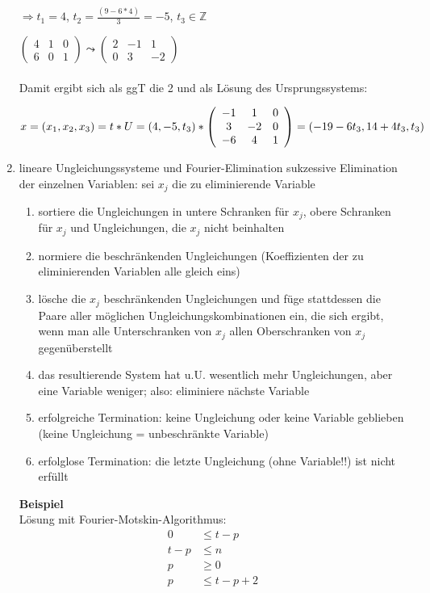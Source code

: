 \begin{enumerate}
$\Rightarrow t_1 = 4$, $t_2 = \frac{(9-6*4)}{3} = -5$, $t_3 \in \mathbb{Z}$


$\left(
\begin{array}{c|cc}
4 & 1 & 0\\
6 & 0 & 1%
\end{array}
\right) \leadsto \left(
\begin{array}{c|cc}
2 & -1 & 1\\
0 &  3 & -2%
\end{array}
\right)
$
\\
\\Damit ergibt sich als ggT die 2 und als Lösung des Ursprungssystems:

$x = (x_1, x_2, x_3) = t * U = 
\\
(4,-5,t_3) *
\left(
\begin{array}{ccc}
-1 & 1 & 0 \\
3 & -2 & 0 \\
-6 & 4 & 1
\end{array}
\right)
=
(-19-6t_3, 14+4t_3, t_3)
$

\item lineare Ungleichungssysteme und Fourier-Elimination
  sukzessive Elimination der einzelnen Variablen: sei $x_j$ die zu
  eliminierende Variable
  \begin{enumerate} 
  \item sortiere die Ungleichungen in untere Schranken für $x_j$, obere
    Schranken für $x_j$ und Ungleichungen, die $x_j$ nicht beinhalten
  \item normiere die beschränkenden Ungleichungen (Koeffizienten der
    zu eliminierenden Variablen alle gleich eins)
  \item lösche die $x_j$ beschränkenden Ungleichungen und füge
    stattdessen die Paare aller möglichen Ungleichungskombinationen ein, 
    die sich ergibt, wenn man alle Unterschranken von $x_j$ allen
    Oberschranken von $x_j$ gegenüberstellt
  \item das resultierende System hat u.U. wesentlich mehr Ungleichungen, 
    aber eine Variable weniger; also: eliminiere nächste Variable
  \item erfolgreiche Termination: keine Ungleichung oder keine Variable
    geblieben (keine Ungleichung = unbeschränkte Variable)
  \item erfolglose Termination: die letzte Ungleichung (ohne
    Variable!!) ist nicht erfüllt
  \end{enumerate}

\textbf{Beispiel}\\
Lösung mit Fourier-Motskin-Algorithmus:
\begin{align*}
0 &\leq t-p\\
t-p &\leq n\\
p &\geq 0\\
p &\leq t-p+2
\end{align*}


\end{enumerate}
